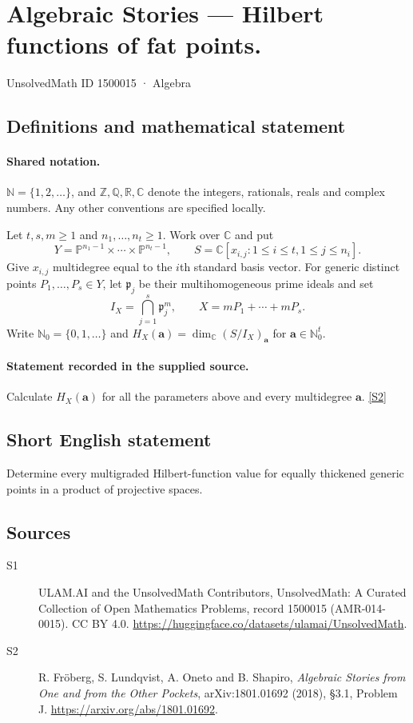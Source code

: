 \documentclass[11pt]{article}
\newcommand{\sref}[2]{\hyperlink{source:#1:#2}{[S#2]}}
\begin{document}
\setcounter{section}{1500014}
\section{Algebraic Stories — Hilbert functions of fat points.}\label{1500015}
{\small\sffamily UnsolvedMath ID 1500015 · Algebra}
\subsection{Definitions and mathematical statement}

\paragraph{Shared notation.}$\mathbb N=\{1,2,\ldots\}$, and $\mathbb Z,\mathbb Q,\mathbb R,\mathbb C$ denote the integers, rationals, reals and complex numbers. Any other conventions are specified locally.


Let $t,s,m\geq1$ and $n_1,\ldots,n_t\geq1$. Work over $\mathbb C$ and put
\[Y=\mathbb P^{n_1-1}\times\cdots\times\mathbb P^{n_t-1},\qquad
S=\mathbb C[x_{i,j}:1\leq i\leq t,1\leq j\leq n_i].
\]
Give $x_{i,j}$ multidegree equal to the $i$th standard basis vector. For generic distinct points $P_1,\ldots,P_s\in Y$, let $\mathfrak p_j$ be their multihomogeneous prime ideals and set
\[I_X=\bigcap_{j=1}^s\mathfrak p_j^m,\qquad X=mP_1+\cdots+mP_s.
\]
Write $\mathbb N_0=\{0,1,\ldots\}$ and $H_X(\boldsymbol a)=\dim_{\mathbb C}(S/I_X)_{\boldsymbol a}$ for $\boldsymbol a\in\mathbb N_0^t$.
\paragraph{Statement recorded in the supplied source.}
Calculate $H_X(\boldsymbol a)$ for all the parameters above and every multidegree $\boldsymbol a$. \sref{1500015}{2}
\subsection{Short English statement}
Determine every multigraded Hilbert-function value for equally thickened generic points in a product of projective spaces.
\subsection{Sources}
\begin{description}
\item[\hypertarget{source:1500015:1}{S1}] ULAM.AI and the UnsolvedMath Contributors, UnsolvedMath: A Curated Collection of Open Mathematics Problems, record 1500015 (AMR-014-0015). CC BY 4.0. \url{https://huggingface.co/datasets/ulamai/UnsolvedMath}.
\item[\hypertarget{source:1500015:2}{S2}] R. Fröberg, S. Lundqvist, A. Oneto and B. Shapiro, \emph{Algebraic Stories from One and from the Other Pockets}, arXiv:1801.01692 (2018), §3.1, Problem J. \url{https://arxiv.org/abs/1801.01692}.
\end{description}
\label{end:1500015}
\end{document}
